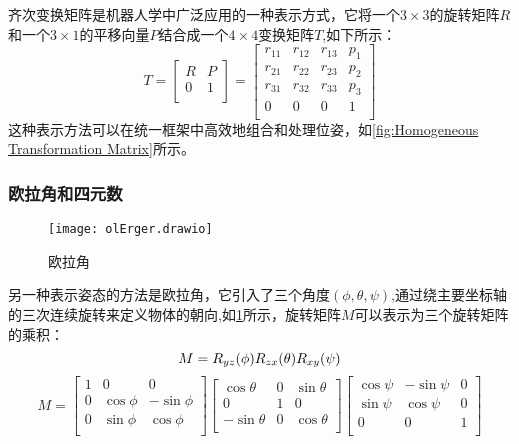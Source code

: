 齐次变换矩阵是机器人学中广泛应用的一种表示方式，它将一个$3\times3$的旋转矩阵$R$和一个$3\times1$的平移向量$P$结合成一个$4\times4$变换矩阵$T$,如下所示：
\begin{equation}
	\label{equ:Homogeneous Transformation Matrix}
	T=
	\begin{bmatrix}
		R & P \\
		0 & 1 \\
	\end{bmatrix}=
	\begin{bmatrix}
		r_{11} & r_{12} & r_{13} & p_{1} \\
		r_{21} & r_{22} & r_{23} & p_{2} \\
		r_{31} & r_{32} & r_{33} & p_{3} \\
		0 & 0 & 0 & 1 \\
	\end{bmatrix}
\end{equation}
这种表示方法可以在统一框架中高效地组合和处理位姿，如\cref{fig:Homogeneous Transformation Matrix}所示。

 \subsubsection{欧拉角和四元数}
 
 \begin{figure}[htb]
 	\texttt{[image: olErger.drawio]}
 	\caption[欧拉角]{欧拉角} %
 	\label{fig: olErger.drawio}
 \end{figure}
 
另一种表示姿态的方法是欧拉角，它引入了三个角度$(\phi,\theta,\psi)$,通过绕主要坐标轴的三次连续旋转来定义物体的朝向,如\cref{fig: olErger.drawio}所示，旋转矩阵$M$可以表示为三个旋转矩阵的乘积：
\begin{equation}
	\label{equ:oulEqu_1}
	M =R_{yz}(\phi)R_{zx}(\theta)R_{xy}(\psi) \\
\end{equation}
\begin{equation}
	\label{equ:oulEqu_2}
	M =
	\begin{bmatrix}
		1 & 0& 0  \\
		0 & \cos\phi & -\sin\phi \\
		0 & \sin\phi & \cos\phi  \\
	\end{bmatrix}
	\begin{bmatrix}
		\cos\theta & 0& \sin\theta  \\
		0 & 1 & 0 \\
		-\sin\theta & 0 & \cos\theta  \\
	\end{bmatrix}
	\begin{bmatrix}
		\cos\psi & -\sin\psi& 0  \\
		\sin\psi & \cos\psi & 0 \\
		0 & 0 & 1  \\
	\end{bmatrix}
\end{equation}

